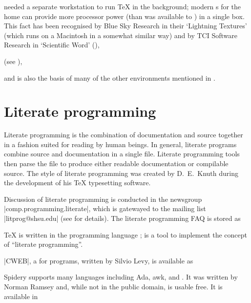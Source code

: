 \VorTeX{} needed a separate workstation to run \TeX{} in the
background; modern s for the home can provide more processor power
(than was available to \VorTeX{}) in a single box.  This fact has been
recognised by Blue Sky Research in their `Lightning Textures' (which
runs on a Macintosh in a somewhat similar way) and by TCI Software
Research in `Scientific Word'
\htmlignore
(),
\endhtmlignore
\begin{htmlversion}
  (see ),
\end{htmlversion}
and is also the basis of many of the other environments mentioned in
.


\section{Literate programming}


Literate programming is the combination of documentation and source
together in a fashion suited for reading by human beings. 
In general, literate programs combine source
and documentation in a single file.  Literate programming tools then
parse the file to produce either readable documentation or compilable
source.  The  style of literate programming was created by D.~E.~Knuth
during the development of his \TeX{} typesetting software.

Discussion of literate programming is conducted in the newsgroup
\Newsgroup|comp.programming.literate|, which is gatewayed to the
mailing list \Email|litprog@shsu.edu| (see
 for
details).  The literate programming FAQ is stored as


\TeX{} is written in the programming language ;  is a tool to
implement the concept of ``literate programming''.  

\ProgName|CWEB|, a  for  programs, written by Silvio
Levy, is available as 

Spidery  supports many 
languages including Ada, awk, and . It was written by Norman Ramsey 
and, while not in the public domain, is usable free. It is available 
in 

